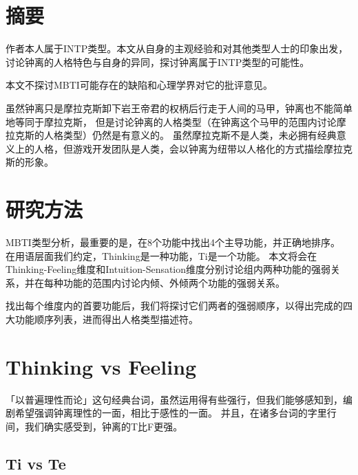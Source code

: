 \documentclass[a4paper,11pt]{article}
\begin{document}
\fulldoctitle


\section*{摘要}

作者本人属于INTP类型。本文从自身的主观经验和对其他类型人士的印象出发，讨论钟离的人格特色与自身的异同，探讨钟离属于INTP类型的可能性。

本文不探讨MBTI可能存在的缺陷和心理学界对它的批评意见。

虽然钟离只是摩拉克斯卸下岩王帝君的权柄后行走于人间的马甲，钟离也不能简单地等同于摩拉克斯，
但是讨论钟离的人格类型（在钟离这个马甲的范围内讨论摩拉克斯的人格类型）仍然是有意义的。
虽然摩拉克斯不是人类，未必拥有经典意义上的人格，但游戏开发团队是人类，会以钟离为纽带以人格化的方式描绘摩拉克斯的形象。











\section{研究方法}

MBTI类型分析，最重要的是，在8个功能中找出4个主导功能，并正确地排序。
在用语层面我们约定，Thinking是一种功能，Ti是一个功能。
本文将会在Thinking-Feeling维度和Intuition-Sensation维度分别讨论组内两种功能的强弱关系，并在每种功能的范围内讨论内倾、外倾两个功能的强弱关系。

找出每个维度内的首要功能后，我们将探讨它们两者的强弱顺序，以得出完成的四大功能顺序列表，进而得出人格类型描述符。










\section{Thinking vs Feeling}

「以普遍理性而论」这句经典台词，虽然运用得有些强行，但我们能够感知到，编剧希望强调钟离理性的一面，相比于感性的一面。
并且，在诸多台词的字里行间，我们确实感受到，钟离的T比F更强。

\subsection{Ti vs Te}
\end{document}
